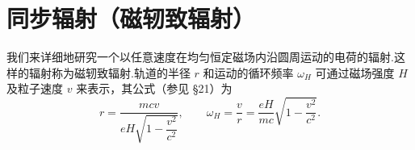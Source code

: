 %
%

\section{同步辐射（磁轫致辐射）}

我们来详细地研究一个以任意速度在均匀恒定磁场内沿圆周运动的电荷的辐射.这样的辐射称为磁轫致辐射.轨道的半径 $r$ 和运动的循环频率 $\omega_H$ 可通过磁场强度 $H$ 及粒子速度 $v$ 来表示，其公式（参见 §21）为
\begin{equation}
  r=\frac{mcv}{eH\sqrt{1-\dfrac{v^2}{c^2}}},\qquad
  \omega_H=\frac{v}{r}=\frac{eH}{mc}\sqrt{1-\frac{v^2}{c^2}}.
\end{equation}

